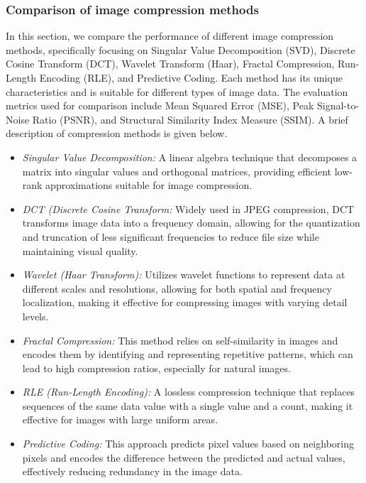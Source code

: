 \documentclass[
  journal,
]{IEEEtran}%
\begin{document}
\subsubsection{Comparison of image compression
methods}\label{comparison-of-image-compression-methods}

In this section, we compare the performance of different image
compression methods, specifically focusing on Singular Value
Decomposition (SVD), Discrete Cosine Transform (DCT), Wavelet Transform
(Haar), Fractal Compression, Run-Length Encoding (RLE), and Predictive
Coding. Each method has its unique characteristics and is suitable for
different types of image data. The evaluation metrics used for
comparison include Mean Squared Error (MSE), Peak Signal-to-Noise Ratio
(PSNR), and Structural Similarity Index Measure (SSIM). A brief
description of compression methods is given below.

\begin{itemize}
\item
  \emph{Singular Value Decomposition:} A linear algebra technique that
  decomposes a matrix into singular values and orthogonal matrices,
  providing efficient low-rank approximations suitable for image
  compression.
\item
  \emph{DCT (Discrete Cosine Transform:} Widely used in JPEG
  compression, DCT transforms image data into a frequency domain,
  allowing for the quantization and truncation of less significant
  frequencies to reduce file size while maintaining visual quality.
\item
  \emph{Wavelet (Haar Transform):} Utilizes wavelet functions to
  represent data at different scales and resolutions, allowing for both
  spatial and frequency localization, making it effective for
  compressing images with varying detail levels.
\item
  \emph{Fractal Compression:} This method relies on self-similarity in
  images and encodes them by identifying and representing repetitive
  patterns, which can lead to high compression ratios, especially for
  natural images.
\item
  \emph{RLE (Run-Length Encoding):} A lossless compression technique
  that replaces sequences of the same data value with a single value and
  a count, making it effective for images with large uniform areas.
\item
  \emph{Predictive Coding:} This approach predicts pixel values based on
  neighboring pixels and encodes the difference between the predicted
  and actual values, effectively reducing redundancy in the image data.
\end{itemize}
\end{document}
